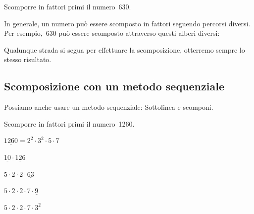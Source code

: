 
\begin{inaccessibleblock}[]
\begin{esempio}{}{}
Scomporre in fattori primi il numero~630.

\vspace{-1em}
\begin{center} \scompa \end{center}
% 
\end{esempio}
\end{inaccessibleblock}

In generale, un numero può essere scomposto in fattori seguendo percorsi 
diversi. Per esempio,~630 può essere scomposto attraverso questi alberi
diversi:

\begin{inaccessibleblock}[]
\begin{minipage}{0.40\textwidth}
\begin{center} \scompb \end{center}
% 
\end{minipage}%
\begin{minipage}{0.40\textwidth}
\begin{center} \scompc \end{center}
% 
\end{minipage}%
\end{inaccessibleblock}


Qualunque strada si segua per effettuare la scomposizione, 
otterremo sempre lo stesso risultato.

\subsection{Scomposizione con un metodo sequenziale}

Possiamo anche usare un metodo sequenziale:
Sottolinea e scomponi.

 \begin{esempio}{}{}
 Scomporre in fattori primi il numero~1260.

\vspace{.5em}
 \(\underline{1260} = 2^{2} \cdot 3^{2} \cdot 5 \cdot 7\)
 
 \(\underline{10} \cdot \underline{126}\)
 
 \(5 \cdot 2 \cdot 2 \cdot \underline{63}\)
 
 \(5 \cdot 2 \cdot 2 \cdot 7 \cdot \underline{9}\)
 
 \(5 \cdot 2 \cdot 2 \cdot 7 \cdot 3^{2}\)
 
 \end{esempio}

